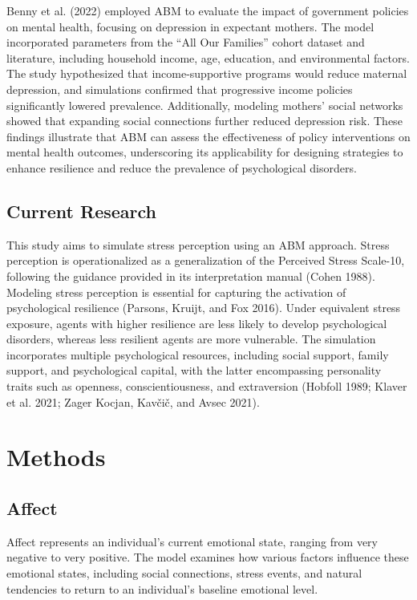 \documentclass[
  letterpaper,
  DIV=11,
  numbers=noendperiod]{scrartcl}
\begin{document}
Benny et al. (2022) employed ABM to evaluate the impact of government
policies on mental health, focusing on depression in expectant mothers.
The model incorporated parameters from the ``All Our Families'' cohort
dataset and literature, including household income, age, education, and
environmental factors. The study hypothesized that income-supportive
programs would reduce maternal depression, and simulations confirmed
that progressive income policies significantly lowered prevalence.
Additionally, modeling mothers' social networks showed that expanding
social connections further reduced depression risk. These findings
illustrate that ABM can assess the effectiveness of policy interventions
on mental health outcomes, underscoring its applicability for designing
strategies to enhance resilience and reduce the prevalence of
psychological disorders.

\subsection{Current Research}\label{current-research}

This study aims to simulate stress perception using an ABM approach.
Stress perception is operationalized as a generalization of the
Perceived Stress Scale-10, following the guidance provided in its
interpretation manual (Cohen 1988). Modeling stress perception is
essential for capturing the activation of psychological resilience
(Parsons, Kruijt, and Fox 2016). Under equivalent stress exposure,
agents with higher resilience are less likely to develop psychological
disorders, whereas less resilient agents are more vulnerable. The
simulation incorporates multiple psychological resources, including
social support, family support, and psychological capital, with the
latter encompassing personality traits such as openness,
conscientiousness, and extraversion (Hobfoll 1989; Klaver et al. 2021;
Zager Kocjan, Kavčič, and Avsec 2021).

\section{Methods}\label{methods}

\subsection{Affect}\label{affect}

Affect represents an individual's current emotional state, ranging from
very negative to very positive. The model examines how various factors
influence these emotional states, including social connections, stress
events, and natural tendencies to return to an individual's baseline
emotional level.
\end{document}
